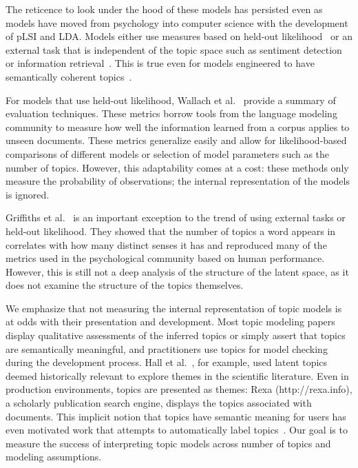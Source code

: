 The reticence to look under the hood of these models has persisted
even as models have moved from psychology into computer science with
the development of pLSI and LDA.  Models either use measures based on
held-out likelihood~\cite{blei-03,blei-06} or an external task that is
independent of the topic space such as sentiment
detection~\cite{titov-08} or information retrieval~\cite{wei-06}.
This is true even for models engineered to have semantically coherent
topics~\cite{boyd-graber-07}.

For models that use held-out likelihood, Wallach et
al.~\cite{wallach-09} provide a summary of evaluation
techniques. These metrics borrow tools from the language modeling
community to measure how well the information learned from a corpus
applies to unseen documents.  These metrics generalize easily and
allow for likelihood-based comparisons of different models or
selection of model parameters such as the number of topics.  However,
this adaptability comes at a cost: these methods only measure the
probability of observations; the internal representation of the models
is ignored.

Griffiths et al.~\cite{griffiths-06} is an important exception to the
trend of using external tasks or held-out likelihood.  They showed
that the number of topics a word appears in correlates with how many
distinct senses it has and reproduced many of the metrics used in the
psychological community based on human performance.  However, this is
still not a deep analysis of the structure of the latent space, as it
does not examine the structure of the topics themselves.

We emphasize that not measuring the internal representation of topic
models is at odds with their presentation and development.  Most topic
modeling papers display qualitative assessments of the inferred topics
or simply assert that topics are semantically meaningful, and
practitioners use topics for model checking during the development
process.  Hall et al.~\cite{hall-08}, for example, used latent topics
deemed historically relevant to explore themes in the scientific
literature.  Even in production environments, topics are presented as
themes: Rexa (http://rexa.info), a scholarly publication search
engine, displays the topics associated with documents.  This implicit
notion that topics have semantic meaning for users has even
motivated work that attempts to automatically label
topics~\cite{mei-07}.  Our goal is to measure the success of
interpreting topic models across number of topics and modeling
assumptions.




